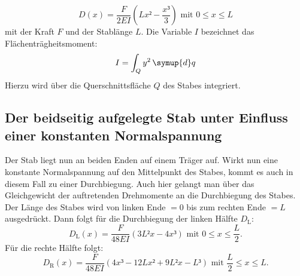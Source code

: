    \begin{equation}
     D(x) = \frac{F}{2EI}\left(Lx² - \frac{x³}{3}\right) \text{ mit }0 \leq x \leq L \label{eq:EinseitigEingespannt}
     \end{equation}
     mit der Kraft $F$ und der Stablänge $L$. Die Variable $I$ bezeichnet das
     Flächenträgheitsmoment:
\begin{equation}
  I = \int_{Q}^{}y^2 \, \symup{d}q \label{eq:Flächenträgheitsmoment}
\end{equation}
Hierzu wird über die Querschnittsfläche $Q$ des Stabes integriert.

\subsection{Der beidseitig aufgelegte Stab unter Einfluss einer konstanten Normalspannung}
Der Stab liegt nun an beiden Enden auf einem Träger auf. Wirkt nun eine
 konstante Normalspannung auf den Mittelpunkt des Stabes, kommt es auch in diesem Fall
  zu einer Durchbiegung.
 Auch hier gelangt man über das Gleichgewicht der auftretenden Drehmomente an die Durchbiegung des Stabes.
 Der Länge des Stabes wird von linken Ende $ = 0$ bis zum rechten Ende $= L$ ausgedrückt.
    Dann folgt für die Durchbiegung der linken Hälfte $D_\text{L}$:
  \begin{equation}
    D_\text{L}(x) = \frac{F}{48 EI}\left(3L²x-4x³\right) \text{ mit } 0 \leq x \leq \frac{L}{2}\text{.}\label{eq:BeidseitigAufgelegtLinks}
  \end{equation}
Für die rechte Hälfte folgt:
\begin{equation}
  D_\text{R}(x) = \frac{F}{48EI}\left(4x³ -12Lx² +9L²x-L³\right) \text{ mit } \frac{L}{2} \leq x \leq L\text{.}\label{eq:BeidseitigAufgelegtRechts}
\end{equation}
